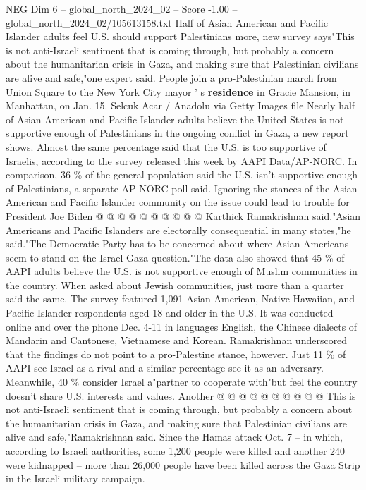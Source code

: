 \begin{textsample}{NEG Dim 6 – global\_north\_2024\_02 – Score -1.00 – global\_north\_2024\_02/105613158.txt}  \label{ex:f6_neg_281}
Half of Asian American and Pacific Islander adults feel U.S. should support Palestinians more, new survey says"This is not anti-Israeli sentiment that is coming through, but probably a concern about the humanitarian crisis in Gaza, and making sure that Palestinian civilians are alive and safe,"one expert said.
People join a pro-Palestinian march from Union Square to the New York City mayor ' s \textbf{residence} in Gracie Mansion, in Manhattan, on Jan. 15.
Selcuk Acar / Anadolu via Getty Images file Nearly half of Asian American and Pacific Islander adults believe the United States is not supportive enough of Palestinians in the ongoing conflict in Gaza, a new report shows.
Almost the same percentage said that the U.S. is too supportive of Israelis, according to the survey released this week by AAPI Data/AP-NORC.
In comparison, 36 \% of the general population said the U.S. isn't supportive enough of Palestinians, a separate AP-NORC poll said.
Ignoring the stances of the Asian American and Pacific Islander community on the issue could lead to trouble for President Joe Biden @ @ @ @ @ @ @ @ @ @ Karthick Ramakrishnan said."Asian Americans and Pacific Islanders are electorally consequential in many states,"he said."The Democratic Party has to be concerned about where Asian Americans seem to stand on the Israel-Gaza question."The data also showed that 45 \% of AAPI adults believe the U.S. is not supportive enough of Muslim communities in the country.
When asked about Jewish communities, just more than a quarter said the same.
The survey featured 1,091 Asian American, Native Hawaiian, and Pacific Islander respondents aged 18 and older in the U.S.
It was conducted online and over the phone Dec. 4-11 in languages English, the Chinese dialects of Mandarin and Cantonese, Vietnamese and Korean.
Ramakrishnan underscored that the findings do not point to a pro-Palestine stance, however.
Just 11 \% of AAPI see Israel as a rival and a similar percentage see it as an adversary.
Meanwhile, 40 \% consider Israel a"partner to cooperate with"but feel the country doesn't share U.S. interests and values.
Another @ @ @ @ @ @ @ @ @ @ This is not anti-Israeli sentiment that is coming through, but probably a concern about the humanitarian crisis in Gaza, and making sure that Palestinian civilians are alive and safe,"Ramakrishnan said.
Since the Hamas attack Oct. 7 -- in which, according to Israeli authorities, some 1,200 people were killed and another 240 were kidnapped -- more than 26,000 people have been killed across the Gaza Strip in the Israeli military campaign.

\end{textsample}
